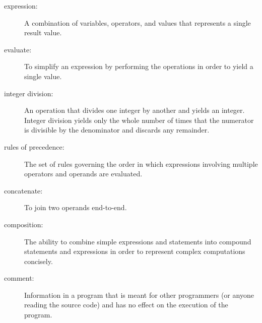 \begin{description}
\item[expression:]  A combination of variables, operators, and values that
represents a single result value.

\item[evaluate:]  To simplify an expression by performing the operations
in order to yield a single value.

\item[integer division:]  An operation that divides one integer by
another and yields an integer.  Integer division yields only the
whole number of times that the numerator is divisible by the
denominator and discards any remainder.

\item[rules of precedence:]  The set of rules governing the order in which
expressions involving multiple operators and operands are evaluated.

\item[concatenate:]  To join two operands end-to-end.

\item[composition:]  The ability to combine simple expressions and statements
into compound statements and expressions in order to represent complex
computations concisely.

\item[comment:]  Information in a program that is meant for other
programmers (or anyone reading the source code) and has no effect on the
execution of the program.


\end{description}
